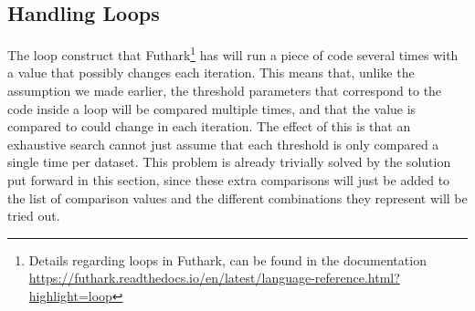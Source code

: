 \subsection{Handling Loops}
The loop construct that Futhark\footnote{Details regarding loops in Futhark, can be found in the documentation \url{https://futhark.readthedocs.io/en/latest/language-reference.html?highlight=loop}} has will run a piece of code several times with
a value that possibly changes each iteration. This means that, unlike the
assumption we made earlier, the threshold
parameters that correspond to the code inside a loop will be compared multiple
times, and that the value is compared to could change in each iteration. The
effect of this is that an exhaustive search cannot just assume that each
threshold is only compared a single time per dataset. This problem is already
trivially solved by the solution put forward in this section, since
these extra comparisons will just be added to the list of comparison values and
the different combinations they represent will be tried out.
